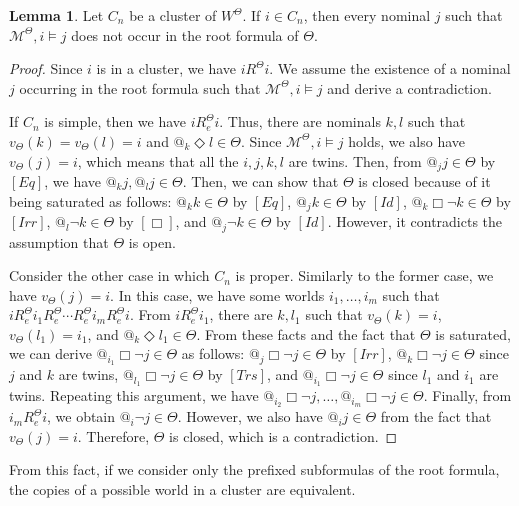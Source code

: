 \documentclass{article}
\theoremstyle{definition}
\newtheorem{lemma}[definition]{Lemma}
\newcommand{\Dia}{\Diamond}
\newcommand{\Kmodel}{\mathcal{M}}
\newcommand{\irr}{\mathit{Irr}}
\newcommand{\trans}{\mathit{Trs}}
\newcommand{\reflexivity}{\mathit{Eq}}
\newcommand{\Id}{\mathit{Id}}
\begin{document}
\begin{lemma}
    Let $C_n$ be a cluster of $W^\Theta$. If $i \in C_n$, then every nominal $j$ such that $\Kmodel^\Theta, i \models j$ does not occur in the root formula of $\Theta$.
    \label{lemclusternotnamed}
\end{lemma}
\begin{proof}
    Since $i$ is in a cluster, we have $i R^\Theta i$.
    We assume the existence of a nominal $j$ occurring in the root formula such that $\Kmodel^\Theta, i \models j$ and derive a contradiction.

    If $C_n$ is simple, then we have $i R_e^\Theta i$. Thus, there are nominals $k, l$ such that $v_\Theta(k) = v_\Theta(l) = i$ and $@_k \Dia l \in \Theta$. Since $\Kmodel^\Theta, i \models j$ holds, we also have $v_\Theta(j) = i$, which means that all the $i, j, k, l$ are twins. Then, from $@_j j \in \Theta$ by $[\reflexivity]$, we have $@_k j, @_l j \in \Theta$. Then, we can show that $\Theta$ is closed because of it being saturated as follows: $@_k k \in \Theta$ by $[\reflexivity]$, $@_j k \in \Theta$ by $[\Id]$, $@_k \Box \neg k \in \Theta$ by $[\irr]$, $@_l \neg k \in \Theta$ by $[\Box]$, and $@_j \neg k \in \Theta$ by $[\Id]$. However, it contradicts the assumption that $\Theta$ is open. 

    Consider the other case in which $C_n$ is proper. Similarly to the former case, we have $v_\Theta(j) = i$. In this case, we have some worlds $i_1, \ldots, i_m$ such that $i R_e^\Theta i_1 R_e^\Theta \cdots R_e^\Theta i_m R_e^\Theta i$. From $i R_e^\Theta i_1$, there are $k, l_1$ such that $v_\Theta(k) = i$, $v_\Theta(l_1) = i_1$, and $@_k \Dia l_1 \in \Theta$. From these facts and the fact that $\Theta$ is saturated, we can derive $@_{i_1} \Box \neg j \in \Theta$ as follows: $@_j \Box \neg j \in \Theta$ by $[\irr]$, $@_k \Box \neg j \in \Theta$ since $j$ and $k$ are twins, $@_{l_1} \Box \neg j \in \Theta$ by $[\trans]$, and $@_{i_1} \Box \neg j \in \Theta$ since $l_1$ and $i_1$ are twins. Repeating this argument, we have $@_{i_2} \Box \neg j, \ldots, @_{i_m} \Box \neg j \in \Theta$. Finally, from $i_m R_e^\Theta i$, we obtain $@_i \neg j \in \Theta$. However, we also have $@_i j \in \Theta$ from the fact that $v_\Theta(j) = i$. Therefore, $\Theta$ is closed, which is a contradiction.
\end{proof}

From this fact, if we consider only the prefixed subformulas of the root formula, the copies of a possible world in a cluster are equivalent.
\end{document}
